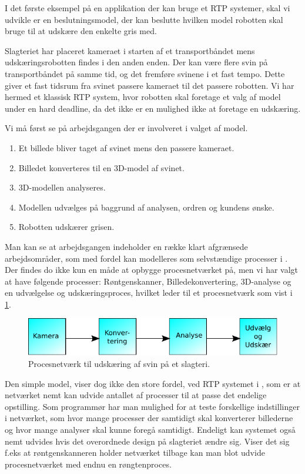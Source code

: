 I det første eksempel på en applikation der kan bruge et RTP systemer, skal vi udvikle er en beslutningsmodel, der kan beslutte hvilken model robotten skal bruge til at  udskære den enkelte gris med. 

Slagteriet har placeret kameraet i starten af et transportbåndet mens udskæringsrobotten findes i den anden enden. Der kan være flere svin på transportbåndet på samme tid, og det fremføre svinene i et fast tempo. Dette giver et fast tidsrum fra svinet passere kameraet til det passere robotten. Vi har hermed et klassisk RTP system, hvor robotten skal foretage et valg af model under en hard deadline, da det ikke er en mulighed ikke at foretage en udskæring.

Vi må først se på arbejdsgangen der er involveret i valget af model. 
\begin{enumerate}
\tightlist
	\item Et billede bliver taget af svinet mens den passere kameraet.
	\item Billedet konverteres til en 3D-model af svinet.
	\item 3D-modellen analyseres.
	\item Modellen udvælges på baggrund af analysen, ordren og kundens ønske.
	\item Robotten udskærer grisen.
\end{enumerate}

Man kan se at arbejdsgangen indeholder en  række klart afgrænsede arbejdsområder, som med fordel kan modelleres som selvstændige processer i \pycsp. Der findes do ikke kun en måde at opbygge procesnetværket på, men vi har valgt at have følgende processer: Røntgenskanner, Billedekonvertering, 3D-analyse og en udvælgelse og udskæringsproces, hvilket leder til et procesnetværk som vist i \cref{fig:pig-network}.

\begin{figure}
 \begin{center}
  \includegraphics[scale=1]{images/pig-network}
	\caption{Procesnetværk til udskæring af svin på et slagteri.}
	\label{fig:pig-network}
\end{center}
\end{figure}

Den simple model, viser dog ikke den store fordel, ved RTP systemet i \pycsp, som er at netværket nemt kan udvide antallet af processer til at passe det endelige opstilling. Som programmør har man mulighed for at teste forskellige indstillinger i netværket, som hvor mange processer der samtidigt skal konverterer billederne og hvor mange analyser skal kunne foregå samtidigt. Endeligt kan systemet også nemt udvides hvis det overordnede design på slagteriet ændre sig. Viser det sig f.eks at røntgenskanneren holder netværket tilbage kan man blot udvide procesnetværket med endnu en røngtenproces.

